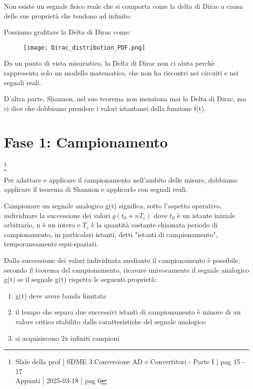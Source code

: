 Non esiste un segnale fisico reale che si comporta come la delta di Dirac a causa delle sue proprietà che tendono ad infinito. \newline 

Possiamo grafitare la Delta di Dirac come: 

\begin{figure}[h]
    \centering
    \texttt{[image: Dirac\_distribution\_PDF.png]}
\end{figure}


\newpage 

Da un punto di vista misuristico, la Delta di Dirac non ci aiuta perchè rappresenta solo un modello matematico, 
che non ha riscontri nei circuiti e nei segnali reali. \newline 

D'altra parte, Shannon, nel suo teorema non menziona mai la Delta di Dirac, ma ci dice che dobbiamo prendere i valori istantanei della funzione f(t). \newline 

\newpage 

\section{Fase 1: Campionamento}
\footnote{Slide della prof | SDME 3.Conversione AD e Convertitori - Parte I | pag 15 - 17 \\  
Appunti | 2025-03-18 | pag 6}

Per adattare e applicare il campionamento nell'ambito delle misure, dobbiamo applicare il teorema di Shannon e applicarlo con segnali reali. \newline 

Campionare un segnale analogico g(t) significa, sotto l'aspetto operativo, 
individuare la successione dei valori $g(t_0 + nT_c)$ dove $t_0$ è un istante iniziale arbitrario, 
n è un intero e $T_c$ è la quantità costante chiamata periodo di campionamento, in particolari istanti, detti "istanti di campionamento", 
temporaneamente equi-spaziati. \newline 

Dalla successione dei valori individuata mediante il campionamento è possibile, secondo il teorema del campionamento, 
ricavare univocamente il segnale analogico g(t) se il segnale g(t) rispetta le seguenti proprietà: 

\begin{enumerate}
    \item g(t) deve avere banda limitata 
    \item il tempo che separa due successivi istanti di campionamento è minore di un valore critico stabilito dalle caratteristiche del segnale analogico 
    \item si acquisiscono 2x infiniti campioni
\end{enumerate}

